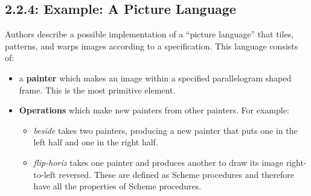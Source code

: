 \documentclass[final,fleqn,titlepage]{article}
\begin{document}
\subsection{2.2.4: Example: A Picture Language}
\label{sec:org2b99359}
Authors describe a possible implementation of a ``picture language'' that tiles,
patterns, and warps images according to a specification. This language consists
of:

\begin{itemize}
\item a \textbf{painter} which makes an image within a specified parallelogram shaped
frame. This is the most primitive element.
\item \textbf{Operations} which make new painters from other painters. For example:
\begin{itemize}
\item \emph{beside} takes two painters, producing a new painter that puts one in the
left half and one in the right half.
\item \emph{flip-horiz} takes one painter and produces another to draw its image
right-to-left reversed. These are defined as Scheme procedures and therefore
have all the properties of Scheme procedures.
\end{itemize}
\end{itemize}
\end{document}
